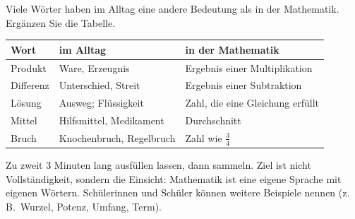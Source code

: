 \documentclass[11pt]{exam}
\begin{document}
\begin{einstieg}
Viele Wörter haben im Alltag eine andere Bedeutung als in der Mathematik.
Ergänzen Sie die Tabelle.

\begin{center}
\renewcommand{\arraystretch}{1.7}
\newcommand{\lsg}[1]{\ifprintanswers\small #1\fi}
\begin{tabular}{|l|p{5.3cm}|p{5.3cm}|}
  \hline
  \textbf{Wort} & \textbf{im Alltag} & \textbf{in der Mathematik} \\ \hline
  Produkt   & \lsg{Ware, Erzeugnis}         & \lsg{Ergebnis einer Multiplikation} \\ \hline
  Differenz & \lsg{Unterschied, Streit}     & \lsg{Ergebnis einer Subtraktion} \\ \hline
  Lösung    & \lsg{Ausweg; Flüssigkeit}     & \lsg{Zahl, die eine Gleichung erfüllt} \\ \hline
  Mittel    & \lsg{Hilfsmittel, Medikament} & \lsg{Durchschnitt} \\ \hline
  Bruch     & \lsg{Knochenbruch, Regelbruch}& \lsg{Zahl wie $\frac{3}{4}$} \\ \hline
\end{tabular}
\end{center}
\end{einstieg}

\begin{lehrperson}
Zu zweit 3 Minuten lang ausfüllen lassen, dann sammeln. Ziel ist nicht
Vollständigkeit, sondern die Einsicht: Mathematik ist eine eigene Sprache mit
eigenen Wörtern. Schülerinnen und Schüler können weitere Beispiele nennen
(z.\,B.\ Wurzel, Potenz, Umfang, Term).
\end{lehrperson}
\end{document}
